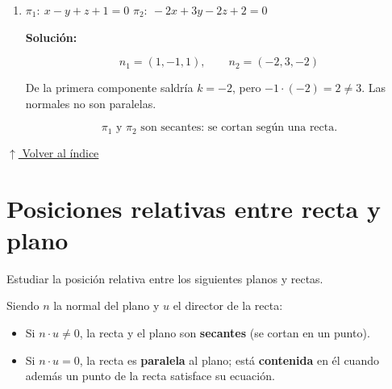\documentclass[12pt]{article}
\newcommand{\solucion}{%
    \vspace{0.8em}%
    \textbf{Solución:}%
    \vspace{0.8em}%
}
\newcommand{\volverindice}{%
    \vspace{1em}%
    \begin{flushright}%
        \hyperlink{indice}{\small $\uparrow$ Volver al índice}%
    \end{flushright}%
}
\begin{document}
\begin{enumerate}[label=\alph*.-]
    \[
    k=\frac{-2}{3},\qquad
    -2\left(-\frac{2}{3}\right)=\frac{4}{3}\ \checkmark,\qquad
    \frac{1}{5}\left(-\frac{2}{3}\right)=-\frac{2}{15}\ \checkmark
    \]

    Las normales son paralelas. Para el término independiente:

    \[
    k\,d_1=-\frac{2}{3}\cdot1=-\frac{2}{3}\neq2=d_2
    \]

    \[
    \boxed{\pi_1 \text{ y } \pi_2 \text{ son paralelos distintos.}}
    \]

    \item $\pi_1:\ x-y+z+1=0$ \qquad $\pi_2:\ -2x+3y-2z+2=0$

    \solucion

    \[
    n_1=(1,-1,1),\qquad n_2=(-2,3,-2)
    \]

    De la primera componente saldría $k=-2$, pero
    $-1\cdot(-2)=2\neq3$. Las normales no son paralelas.

    \[
    \boxed{\pi_1 \text{ y } \pi_2 \text{ son secantes: se cortan según una recta.}}
    \]

\end{enumerate}

\volverindice
\newpage


\section{Posiciones relativas entre recta y plano}

Estudiar la posición relativa entre los siguientes planos y rectas.

Siendo $n$ la normal del plano y $u$ el director de la recta:

\begin{itemize}
    \item Si $n\cdot u\neq0$, la recta y el plano son \textbf{secantes}
    (se cortan en un punto).
    \item Si $n\cdot u=0$, la recta es \textbf{paralela} al plano; está
    \textbf{contenida} en él cuando además un punto de la recta satisface
    su ecuación.
\end{itemize}
\end{document}

